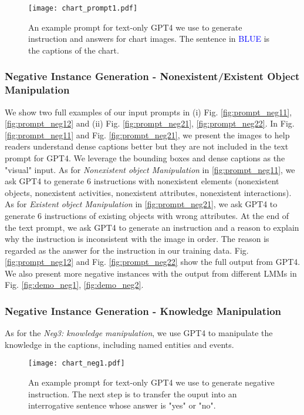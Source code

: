 \begin{figure*}[h]
    \centering
      \texttt{[image: chart\_prompt1.pdf]}
    \caption{An example prompt for text-only GPT4 we use to generate instruction and answers for chart images. The sentence in \textcolor{blue}{BLUE} is the captions of the chart.}
    \label{fig:chart_prompt1}
    \vspace{-0.2in}
\end{figure*}






\subsubsection{Negative Instance Generation - Nonexistent/Existent Object Manipulation}
We show two full examples of our input prompts in (i) Fig. \ref{fig:prompt_neg11}, \ref{fig:prompt_neg12} and (ii) Fig. \ref{fig:prompt_neg21}, \ref{fig:prompt_neg22}. In Fig. \ref{fig:prompt_neg11} and Fig. \ref{fig:prompt_neg21}, we present the images to help readers understand dense captions better but they are not included in the text prompt for GPT4. We leverage the bounding boxes and dense captions as the "visual" input. As for  \textit{Nonexistent object Manipulation} in \ref{fig:prompt_neg11}, we ask GPT4 to generate 6 instructions with nonexistent elements (nonexistent objects, nonexistent activities, nonexistent attributes, nonexistent interactions). As for  \textit{Existent object Manipulation} in \ref{fig:prompt_neg21}, we ask GPT4 to generate 6 instructions of existing objects with wrong attributes. At the end of the text prompt, we ask GPT4 to generate an instruction and a reason to explain why the instruction is inconsistent with the image in order. The reason is regarded as the answer for the instruction in our training data. Fig. \ref{fig:prompt_neg12} and Fig. \ref{fig:prompt_neg22} show the full output from GPT4. We also present more negative instances with the output from different LMMs in Fig. \ref{fig:demo_neg1}, \ref{fig:demo_neg2}. 

\subsubsection{Negative Instance Generation - Knowledge Manipulation}
As for the \textit{Neg3: knowledge manipulation}, we use GPT4 to manipulate the knowledge in the captions, including named entities and events.

\begin{figure*}[h]
    \centering
      \texttt{[image: chart\_neg1.pdf]}
    \caption{An example prompt for text-only GPT4 we use to generate negative instruction. The next step is to transfer the ouput into an interrogative sentence whose answer is "yes" or "no". }
    \label{fig:chart_neg1_prompt}
    \vspace{-0.2in}
\end{figure*}

